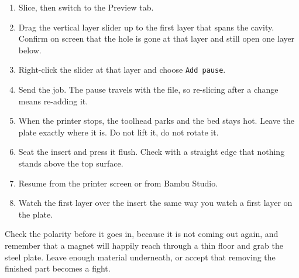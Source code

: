 \begin{enumerate}[itemsep=2pt]
  \item Slice, then switch to the Preview tab.
  \item Drag the vertical layer slider up to the first layer that spans the
        cavity. Confirm on screen that the hole is gone at that layer and still
        open one layer below.
  \item Right-click the slider at that layer and choose \texttt{Add pause}.
  \item Send the job. The pause travels with the file, so re-slicing after a
        change means re-adding it.
  \item When the printer stops, the toolhead parks and the bed stays hot. Leave
        the plate exactly where it is. Do not lift it, do not rotate it.
  \item Seat the insert and press it flush. Check with a straight edge that
        nothing stands above the top surface.
  \item Resume from the printer screen or from Bambu Studio.
  \item Watch the first layer over the insert the same way you watch a first
        layer on the plate.
\end{enumerate}


 Check the polarity
before it goes in, because it is not coming out again, and remember that a
magnet will happily reach through a thin floor and grab the steel plate. Leave
enough material underneath, or accept that removing the finished part becomes a
fight.

